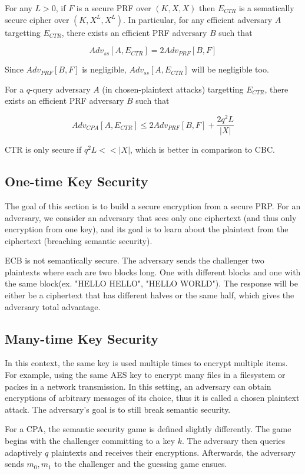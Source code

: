 \documentclass{article}
\begin{document}
\begin{multicols}{2}
For any $L>0$, if $F$ is a secure PRF over $(K,X,X)$ then $E_{CTR}$ is a sematically secure cipher over $(K,X^L,X^L)$. In particular, for any efficient adversary $A$ targetting $E_{CTR}$, there exists an efficient PRF adversary $B$ such that 

$$
Adv_{ss}[A,E_{CTR}] = 2Adv_{PRF}[B,F]
$$

Since $Adv_{PRF}[B,F]$ is negligible, $Adv_{ss}[A,E_{CTR}]$ will be negligible too.

For a $q$-query adversary $A$ (in chosen-plaintext attacks) targetting $E_{CTR}$, there exists an efficient PRF adversary $B$ such that

$$
Adv_{CPA}[A,E_{CTR}] \leq 2Adv_{PRF}[B,F] + \frac{2q^2L}{|X|}
$$

CTR is only secure if $q^2L << |X|$, which is better in comparison to CBC.

\subsection{One-time Key Security}

The goal of this section is to build a secure encryption from a secure PRP. For an adversary, we consider an adversary that sees only one ciphertext (and thus only encryption from one key), and its goal is to learn about the plaintext from the ciphertext (breaching semantic security).

ECB is not semantically secure. The adversary sends the challenger two plaintexts where each are two blocks long. One with different blocks and one with the same block(ex. "HELLO HELLO", "HELLO WORLD"). The response will be either be a ciphertext that has different halves or the same half, which gives the adversary total advantage.

\subsection{Many-time Key Security}

In this context, the same key is used multiple times to encrypt multiple items. For example, using the same AES key to encrypt many files in a filesystem or packes in a network transmission. In this setting, an adversary can obtain encryptions of arbitrary messages of its choice, thus it is called a chosen plaintext attack. The adversary's goal is to still break semantic security.

For a CPA, the semantic security game is defined slightly differently. The game begins with the challenger committing to a key $k$. The adversary then queries adaptively $q$ plaintexts and receives their encryptions. Afterwards, the adversary sends $m_0, m_1$ to the challenger and the guessing game ensues.


\end{multicols}
\end{document}
